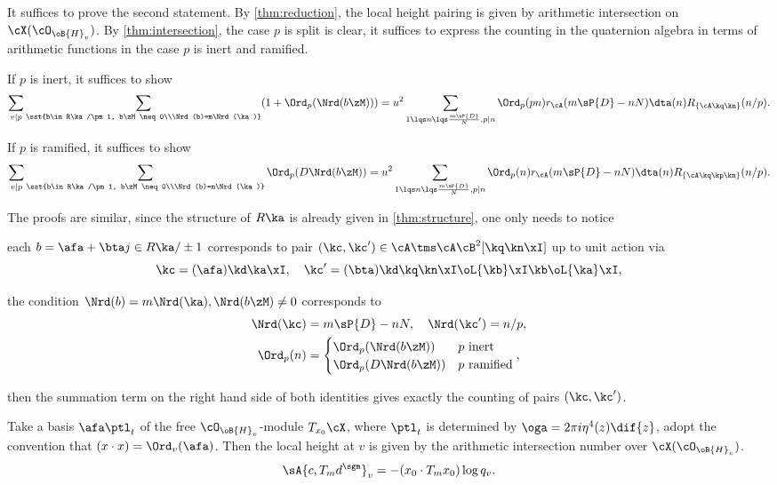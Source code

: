 \documentclass[article, a4paper, twoside]{universal}
\begin{document}
\begin{prf}
	It suffices to prove the second statement. By \cref{thm:reduction}, the local height pairing is given by arithmetic intersection on $\cX(\cO_{\oB{H}_{v}})$. By \cref{thm:intersection}, the case $p$ is split is clear, it suffices to express the counting in the quaternion algebra in terms of arithmetic functions in the case $p$ is inert and ramified.

	If $p$ is inert, it suffices to show
	\[
		\sum_{v\mid p}\sum_{\sst{b\in R\ka/\pm1, b\zM\neq0\\\Nrd(b)=m\Nrd(\ka)}}(1+\Ord_{p}(\Nrd(b\zM)))=u^{2}\sum_{1\lqs n\lqs \frac{m\sP{D}}{N}, p\mid n}\Ord_{p}(pn)r_{\cA}(m\sP{D}-nN)\dta(n)R_{\{\cA\kq\kn\}}(n/p).
	\]

	If $p$ is ramified, it suffices to show
	\[
		\sum_{v\mid p}\sum_{\sst{b\in R\ka/\pm1, b\zM\neq0\\\Nrd(b)=m\Nrd(\ka)}}\Ord_{p}(D\Nrd(b\zM))=u^{2}\sum_{1\lqs n\lqs \frac{m\sP{D}}{N}, p\mid n}\Ord_{p}(n)r_{\cA}(m\sP{D}-nN)\dta(n)R_{\{\cA\kq\kp\kn\}}(n/p).
	\]

	The proofs are similar, since the structure of $R\ka$ is already given in \cref{thm:structure}, one only needs to notice
	\begin{itm}
		\item each $b=\afa+\bta j\in R\ka/\pm1$ corresponds to pair $(\kc,\kc')\in\cA\tms\cA\cB^{2}[\kq\kn\xI]$ up to unit action via
		\[
			\kc=(\afa)\kd\ka\xI,\quad \kc'=(\bta)\kd\kq\kn\xI\oL{\kb}\xI\kb\oL{\ka}\xI,
		\]
		\item the condition $\Nrd(b)=m\Nrd(\ka), \Nrd(b\zM)\neq0$ corresponds to
		\begin{align*}
			\Nrd(\kc)&=m\sP{D}-nN,\quad \Nrd(\kc')=n/p, \\
			\Ord_{p}(n)&=\begin{cases}
						  \Ord_{p}(\Nrd(b\zM)) & \text{$p$ inert} \\
						  \Ord_{p}(D\Nrd(b\zM)) & \text{$p$ ramified} \\
						\end{cases},
		\end{align*}
	\end{itm}
	then the summation term on the right hand side of both identities gives exactly the counting of pairs $(\kc,\kc')$.
\end{prf}

\begin{thm}\label{thm:reduction}
	Take a basis $\afa\ptl_{t}$ of the free $\cO_{\oB{H}_{v}}$-module $T_{x_{0}}\cX$, where $\ptl_{t}$ is determined by $\oga=2\pi i\eta^{4}(z)\dif{z}$, adopt the convention that $(x\cdot x)=\Ord_{v}(\afa)$. Then the local height at $v$ is given by the arithmetic intersection number over $\cX(\cO_{\oB{H}_{v}})$.
	\[
		\sA{c,T_{m}d^{\sgm}}_{v}=-(x_{0}\cdot T_{m}x_{0})\log{q_{v}}.
	\]

\end{thm}
\end{document}
